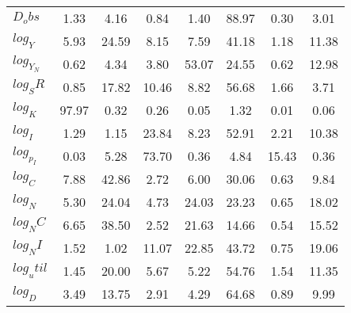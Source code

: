 \begin{center}
\begin{longtable}{lccccccc}
$D_obs     $	 & 	        1.33	 & 	        4.16	 & 	        0.84	 & 	        1.40	 & 	       88.97	 & 	        0.30	 & 	        3.01 \\ 
$log_Y     $	 & 	        5.93	 & 	       24.59	 & 	        8.15	 & 	        7.59	 & 	       41.18	 & 	        1.18	 & 	       11.38 \\ 
$log_Y_N   $	 & 	        0.62	 & 	        4.34	 & 	        3.80	 & 	       53.07	 & 	       24.55	 & 	        0.62	 & 	       12.98 \\ 
$log_SR    $	 & 	        0.85	 & 	       17.82	 & 	       10.46	 & 	        8.82	 & 	       56.68	 & 	        1.66	 & 	        3.71 \\ 
$log_K     $	 & 	       97.97	 & 	        0.32	 & 	        0.26	 & 	        0.05	 & 	        1.32	 & 	        0.01	 & 	        0.06 \\ 
$log_I     $	 & 	        1.29	 & 	        1.15	 & 	       23.84	 & 	        8.23	 & 	       52.91	 & 	        2.21	 & 	       10.38 \\ 
$log_p_I   $	 & 	        0.03	 & 	        5.28	 & 	       73.70	 & 	        0.36	 & 	        4.84	 & 	       15.43	 & 	        0.36 \\ 
$log_C     $	 & 	        7.88	 & 	       42.86	 & 	        2.72	 & 	        6.00	 & 	       30.06	 & 	        0.63	 & 	        9.84 \\ 
$log_N     $	 & 	        5.30	 & 	       24.04	 & 	        4.73	 & 	       24.03	 & 	       23.23	 & 	        0.65	 & 	       18.02 \\ 
$log_NC    $	 & 	        6.65	 & 	       38.50	 & 	        2.52	 & 	       21.63	 & 	       14.66	 & 	        0.54	 & 	       15.52 \\ 
$log_NI    $	 & 	        1.52	 & 	        1.02	 & 	       11.07	 & 	       22.85	 & 	       43.72	 & 	        0.75	 & 	       19.06 \\ 
$log_util  $	 & 	        1.45	 & 	       20.00	 & 	        5.67	 & 	        5.22	 & 	       54.76	 & 	        1.54	 & 	       11.35 \\ 
$log_D     $	 & 	        3.49	 & 	       13.75	 & 	        2.91	 & 	        4.29	 & 	       64.68	 & 	        0.89	 & 	        9.99 \\ 
\end{longtable}
 \end{center}
